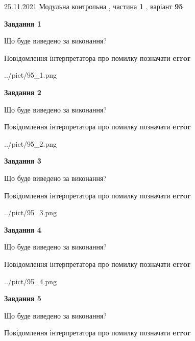 \documentclass[10pt, ukrainian]{article}
\begin{document}
{25.11.2021 Модульна контрольна , частина \textbf { 1 }, варіант  \No \textbf { 95 }\par}
{
\begin {large}

{\begin {center}\textbf{Завдання 1}\end {center}}\par
Що буде виведено за виконання? \par
Повідомлення інтерпретатора про помилку позначати \textbf{error}

\begin{center}
	{../pict/95_1.png}
\end{center}
\newpage

{\begin {center}\textbf{Завдання 2}\end {center}}\par
Що буде виведено за виконання? \par
Повідомлення інтерпретатора про помилку позначати \textbf{error}

\begin{center}
	{../pict/95_2.png}
\end{center}
\newpage

{\begin {center}\textbf{Завдання 3}\end {center}}\par
Що буде виведено за виконання? \par
Повідомлення інтерпретатора про помилку позначати \textbf{error}

\begin{center}
	{../pict/95_3.png}
\end{center}
\newpage

{\begin {center}\textbf{Завдання 4}\end {center}}\par
Що буде виведено за виконання? \par
Повідомлення інтерпретатора про помилку позначати \textbf{error}

\begin{center}
	{../pict/95_4.png}
\end{center}
\newpage

{\begin {center}\textbf{Завдання 5}\end {center}}\par
Що буде виведено за виконання? \par
Повідомлення інтерпретатора про помилку позначати \textbf{error}


\end{large}}
\end{document}
